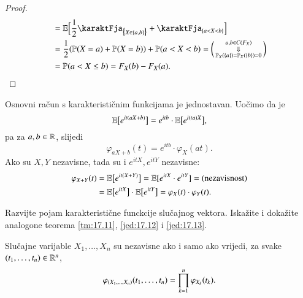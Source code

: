 \begin{proof}
\begin{equation*}
\begin{aligned}
            &= \masE \Big[ \frac{1}{2} \karaktFja_{\big\{ X \in \{a, b\} \big\}} + \karaktFja_{\{a < X < b\}} \Big]\\
            &= \frac{1}{2} (\masP (X = a) + \masP (X = b) ) + \masP (a < X < b) =
            \begin{psmallmatrix}
                a, b \in C(F_X)\\
                \Downarrow\\
                \masP_X (\{ a \}) = \masP_X (\{ b \}) = 0
            \end{psmallmatrix}\\
            &= \masP ( a < X \leq b) = F_X (b) - F_X (a).
        \end{aligned}
    \end{equation*}
\end{proof}

Osnovni ra\v cun s karakteristi\v cnim funkcijama je jednostavan.
Uo\v cimo da je
\begin{equation*}
    \mathbb{E} \big[ e^{it (aX+b)} \big] = e^{itb} \cdot \mathbb{E} \big[ e^{i (ta) X} \big],
\end{equation*}
pa za $a, b \in \mathbb{R}$, slijedi
\begin{equation}    \label{jed:17.12}
    \varphi_{aX+b} (t) = e^{itb} \cdot \varphi_X (a t).
\end{equation}
Ako su $X, Y$ nezavisne, tada su i $e^{itX}, e^{itY}$ nezavisne:
\begin{equation}    \label{jed:17.13}
    \begin{aligned}
        \varphi_{X+Y} (t) &= \mathbb{E} \big[ e^{it(X+Y)} \big] = \mathbb{E} [e^{itX} \cdot e^{itY}] = (\textnormal{nezavisnost})\\
        &= \mathbb{E} \big[ e^{itX} \big] \cdot \mathbb{E} \big[ e^{itY} \big] = \varphi_X (t) \cdot \varphi_Y (t).
    \end{aligned}
\end{equation}

\begin{zad} \label{zad:17.14}
    Razvijte pojam karakteristi\v cne funckcije slu\v cajnog vektora.
    Iska\v zite i doka\v zite analogone teorema \ref{tm:17.11}, \eqref{jed:17.12} i \eqref{jed:17.13}.
\end{zad}

\begin{tm}  \label{tm:17.15}
    Slu\v cajne varijable $X_1, \ldots, X_n$ su nezavisne ako i samo ako vrijedi, za svake $(t_1, \ldots, t_n) \in \mathbb{R}^n$,
    \begin{equation*}
        \varphi_{(X_1, \ldots, X_n)} (t_1 , \ldots, t_n) = \prod\limits_{k = 1}^{n} \varphi_{X_k} (t_k).
    \end{equation*}
\end{tm}

